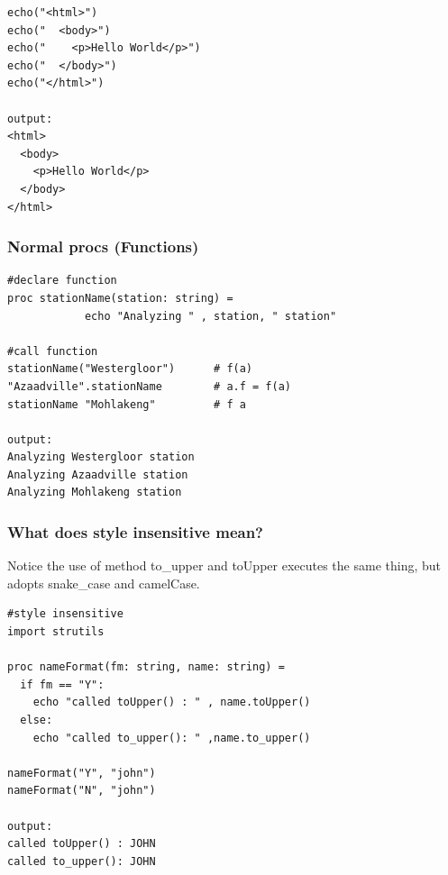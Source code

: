 \documentclass[10pt, a4paper, twocolumn]{article} %
\begin{document}
\begin{lstlisting}
echo("<html>")
echo("  <body>")
echo("    <p>Hello World</p>")
echo("  </body>")
echo("</html>")

output:
<html>
  <body>
    <p>Hello World</p>
  </body>
</html>
\end{lstlisting}


\subsubsection{Normal procs (Functions)}

\begin{lstlisting}
#declare function
proc stationName(station: string) =
			echo "Analyzing " , station, " station"

#call function
stationName("Westergloor")      # f(a)
"Azaadville".stationName        # a.f = f(a)
stationName "Mohlakeng"         # f a

output:
Analyzing Westergloor station
Analyzing Azaadville station
Analyzing Mohlakeng station
\end{lstlisting}
\newpage
\subsubsection{What does style insensitive mean?}

Notice the use of method to\_upper\(\) and toUpper\(\) executes
the same thing, but adopts snake\_case and camelCase.

\begin{lstlisting}
#style insensitive
import strutils

proc nameFormat(fm: string, name: string) =
  if fm == "Y":
    echo "called toUpper() : " , name.toUpper()
  else:
    echo "called to_upper(): " ,name.to_upper()

nameFormat("Y", "john")
nameFormat("N", "john")

output:
called toUpper() : JOHN
called to_upper(): JOHN
\end{lstlisting}

\printbibliography[title={Bibliography}] %

\end{document}
